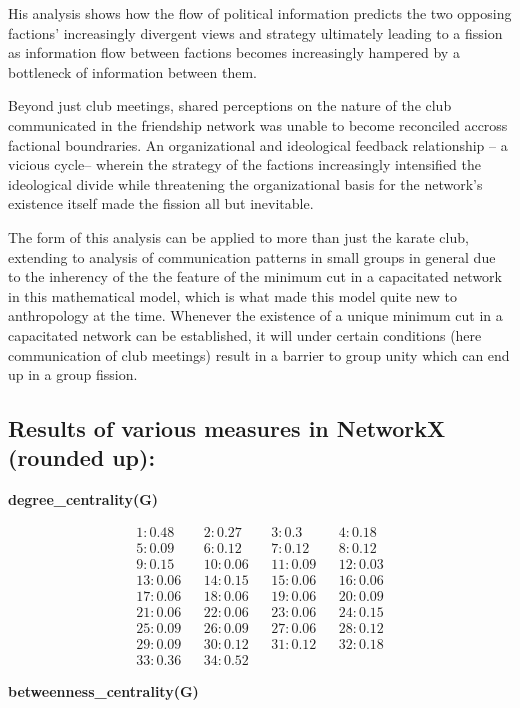 \documentclass[11pt]{article}
\begin{document}
His analysis shows how the flow of political information predicts the two opposing
factions' increasingly divergent views and strategy ultimately leading to a fission
as information flow between factions becomes increasingly hampered by a bottleneck
of information between them.

Beyond just club meetings, shared perceptions on the nature of the club communicated
in the friendship network was unable to become reconciled accross factional boundraries.
An organizational and ideological feedback relationship -- a vicious cycle-- wherein the
strategy of the factions increasingly intensified the ideological divide while threatening
the organizational basis for the network's existence itself made the fission all but
inevitable.

The form of this analysis can be applied to more than just the karate club, extending to
analysis of communication patterns in small groups in general due to the inherency of the
the feature of the minimum cut in a capacitated network in this mathematical model, which
is what made this model quite new to anthropology at the time. Whenever the existence of
a unique minimum cut in a capacitated network can be established, it will under certain
conditions (here communication of club meetings) result in a barrier to group unity which
can end up in a group fission.

\subsection{ Results of various measures in NetworkX (rounded up): }
\textbf{degree\_centrality(G)}

\begin{align*}
1: 0.48 && 2: 0.27 && 3: 0.3 && 4: 0.18 \\
5: 0.09 && 6: 0.12 && 7: 0.12 && 8: 0.12 \\
9: 0.15 && 10: 0.06 && 11: 0.09 && 12: 0.03 \\
13: 0.06 && 14: 0.15 && 15: 0.06 && 16: 0.06 \\
17: 0.06 && 18: 0.06 && 19: 0.06 && 20: 0.09 \\
21: 0.06 && 22: 0.06 && 23: 0.06 && 24: 0.15 \\
25: 0.09 && 26: 0.09 && 27: 0.06 && 28: 0.12 \\
29: 0.09 && 30: 0.12 && 31: 0.12 && 32: 0.18 \\
33: 0.36 && 34: 0.52 && &&
\end{align*}

\textbf{betweenness\_centrality(G)}
\end{document}
